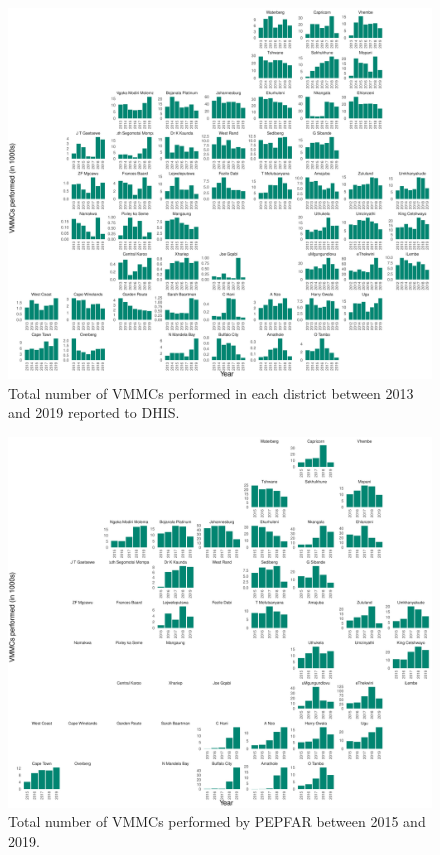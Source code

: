 \documentclass{article}
\begin{document}
\begin{appendix}
\begin{figure}[H]
	\centering
	\includegraphics[width = \linewidth]{Figures/suppmat/IDA/NumMMC_DHIS_District}
	\caption{Total number of VMMCs performed in each district between 2013 and 2019 reported to DHIS.}
\end{figure}


\begin{figure}[H]
	\centering
	\includegraphics[width = \linewidth]{Figures/suppmat/IDA/NumMMC_PEPFAR_District.pdf}
	\caption{Total number of VMMCs performed by PEPFAR between 2015 and 2019.}
\end{figure}


\end{appendix}
\end{document}
